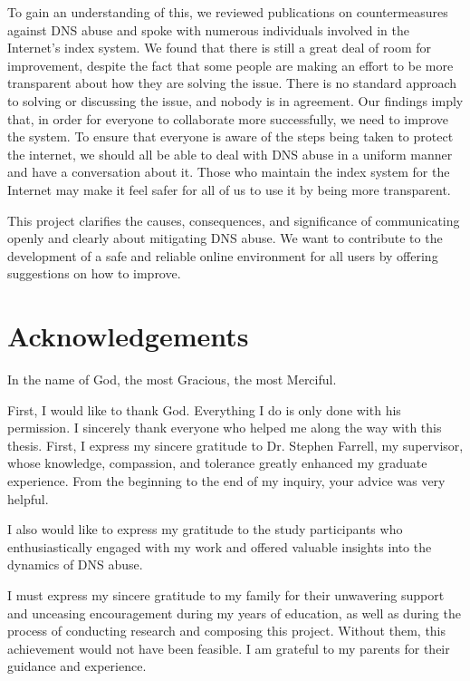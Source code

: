 \documentclass[a4paper,oneside,12pt]{book}
\numberwithin{equation}{chapter} %
\begin{document}
To gain an understanding of this, we reviewed publications on countermeasures against DNS abuse and spoke with numerous individuals involved in the Internet's index system. We found that there is still a great deal of room for improvement, despite the fact that some people are making an effort to be more transparent about how they are solving the issue. There is no standard approach to solving or discussing the issue, and nobody is in agreement. Our findings imply that, in order for everyone to collaborate more successfully, we need to improve the system. To ensure that everyone is aware of the steps being taken to protect the internet, we should all be able to deal with DNS abuse in a uniform manner and have a conversation about it. Those who maintain the index system for the Internet may make it feel safer for all of us to use it by being more transparent.

This project clarifies the causes, consequences, and significance of communicating openly and clearly about mitigating DNS abuse. We want to contribute to the development of a safe and reliable online environment for all users by offering suggestions on how to improve.



\newpage
\onehalfspacing\raggedright %

\section*{\Huge\textcolor{tcd_blue}{Acknowledgements}}

In the name of God, the most Gracious, the most Merciful.

First, I would like to thank God. Everything I do is only done with his permission. I sincerely thank everyone who helped me along the way with this thesis. First, I express my sincere gratitude to Dr. Stephen Farrell, my supervisor, whose knowledge, compassion, and tolerance greatly enhanced my graduate experience. From the beginning to the end of my inquiry, your advice was very helpful.

I also would like to express my gratitude to the study participants who enthusiastically engaged with my work and offered valuable insights into the dynamics of DNS abuse.

I must express my sincere gratitude to my family for their unwavering support and unceasing encouragement during my years of education, as well as during the process of conducting research and composing this project. Without them, this achievement would not have been feasible. I am grateful to my parents for their guidance and experience.
\end{document}
